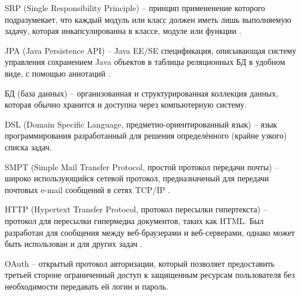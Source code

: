 \hypertarget{gloss:srp}{
    SRP (Single Responsibility Principle) – принцип примененение которого подразумевает, что каждый модуль или класс должен иметь лишь выполняемую задачу, 
    которая инкапсулированна в классе, модуле или функции \cite{srp}.
}

\hypertarget{gloss:jpa}{
    JPA (Java Persistence API) – Java EE/SE спецификация, описывающая систему управления сохранением Java объектов в таблицы реляционных БД в удобном виде, с помощью аннотаций \cite{jpa}.
}

\hypertarget{gloss:db}{
    БД (база данных) – организованная и структурированная коллекция данных, которая обычно хранится и доступна через компьютерную систему.
}

\hypertarget{gloss:dsl}{
    DSL (Domain Specific Language, предметно-ориентированный язык) – язык программирования разработанный для решения определённого (крайне узкого) списка задач. 
}

\hypertarget{gloss:smtp}{
    SMPT (Simple Mail Transfer Protocol, простой протокол передачи почты) – широко использующийся сетевой протокол, предназначеный для передачи почтовых e-mail сообщений в сетях TCP/IP \cite{smpt}. 
}

\hypertarget{gloss:http}{
    HTTP (Hypertext Transfer Protocol, протокол пересылки гипертекста) – протокол для пересылки гипермедиа документов, таких как HTML.
    Был разработан для сообщения между веб-браузерами и веб-серверами, однако может быть использован и для других задач \cite{http}.
}

\hypertarget{gloss:oauth}{
    OAuth – открытый протокол авторизации, который позволяет предоставить третьей стороне ограниченный доступ к защищенным ресурсам пользователя без необходимости передавать ей логин и пароль.
}

\clearpage